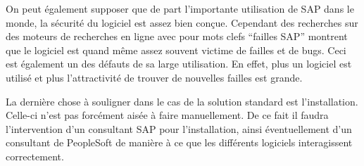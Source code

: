 On peut également supposer que de part l’importante utilisation de SAP dans le monde, la sécurité du logiciel est assez bien conçue. Cependant des recherches sur des moteurs de recherches en ligne avec pour mots clefs “failles SAP” montrent que le logiciel est quand même assez souvent victime de failles et de bugs. Ceci est également un des défauts de sa large utilisation. En effet, plus un logiciel est utilisé et plus l'attractivité de trouver de nouvelles failles est grande.

La dernière chose à souligner dans  le cas de la solution standard est l’installation. Celle-ci n’est pas forcément aisée à faire manuellement. De ce fait il faudra l’intervention d’un consultant SAP pour l’installation, ainsi éventuellement d’un consultant de PeopleSoft de manière à ce que les différents logiciels interagissent correctement.